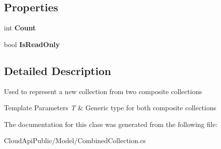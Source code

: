 \subsection*{Properties}
\begin{DoxyCompactItemize}
\item 
\hypertarget{class_cloud_api_public_1_1_model_1_1_combined_collection_3_01_t_01_4_a86806c5243371f2cd9fd9a48671f727a}{int {\bfseries Count}}\label{class_cloud_api_public_1_1_model_1_1_combined_collection_3_01_t_01_4_a86806c5243371f2cd9fd9a48671f727a}

\item 
\hypertarget{class_cloud_api_public_1_1_model_1_1_combined_collection_3_01_t_01_4_ab331a00bb51e137320e9aa8280d4279b}{bool {\bfseries Is\-Read\-Only}}\label{class_cloud_api_public_1_1_model_1_1_combined_collection_3_01_t_01_4_ab331a00bb51e137320e9aa8280d4279b}

\end{DoxyCompactItemize}


\subsection{Detailed Description}
Used to represent a new collection from two composite collections 


\begin{DoxyTemplParams}{Template Parameters}
{\em T} & Generic type for both composite collections\\
\hline
\end{DoxyTemplParams}


The documentation for this class was generated from the following file\-:\begin{DoxyCompactItemize}
\item 
Cloud\-Api\-Public/\-Model/Combined\-Collection.\-cs\end{DoxyCompactItemize}
